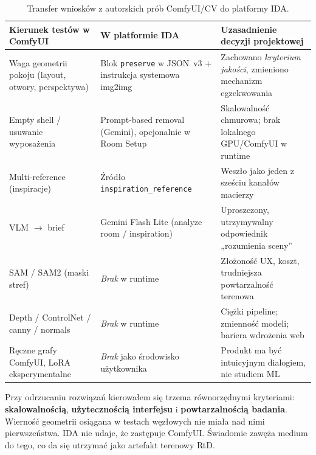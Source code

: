 \begin{table}[htbp]
  \centering
  \caption{Transfer wniosków z autorskich prób ComfyUI/CV do platformy IDA.}
  \label{tab:ch07:comfyui-transfer}
  \begin{tabular}{@{}>{\raggedright\arraybackslash}p{}>{\raggedright\arraybackslash}p{}>{\raggedright\arraybackslash}p{}@{}}
    \toprule
    Kierunek testów w ComfyUI & W platformie IDA & Uzasadnienie decyzji projektowej \\
    \midrule
    Waga geometrii pokoju (layout, otwory, perspektywa) &
    Blok \texttt{preserve} w JSON~v3 + instrukcja systemowa img2img &
    Zachowano \emph{kryterium jakości}, zmieniono mechanizm egzekwowania \\
    \addlinespace
    Empty shell / usuwanie wyposażenia &
    Prompt-based removal (Gemini), opcjonalnie w Room Setup &
    Skalowalność chmurowa; brak lokalnego GPU/ComfyUI w runtime \\
    \addlinespace
    Multi-reference (inspiracje) &
    Źródło \texttt{inspiration\_reference} &
    Weszło jako jeden z sześciu kanałów macierzy \\
    \addlinespace
    VLM $\rightarrow$ brief &
    Gemini Flash Lite (analyze room / inspiration) &
    Uproszczony, utrzymywalny odpowiednik „rozumienia sceny” \\
    \addlinespace
    SAM / SAM2 (maski stref) &
    \emph{Brak} w runtime &
    Złożoność UX, koszt, trudniejsza powtarzalność terenowa \\
    \addlinespace
    Depth / ControlNet / canny / normals &
    \emph{Brak} w runtime &
    Ciężki pipeline; zmienność modeli; bariera wdrożenia web \\
    \addlinespace
    Ręczne grafy ComfyUI, LoRA eksperymentalne &
    \emph{Brak} jako środowisko użytkownika &
    Produkt ma być intuicyjnym dialogiem, nie studiem ML \\
    \bottomrule
  \end{tabular}
\end{table}

Przy odrzucaniu rozwiązań kierowałem się trzema równorzędnymi kryteriami: \textbf{skalowalnością}, \textbf{użytecznością interfejsu} i \textbf{powtarzalnością badania}. Wierność geometrii osiągana w testach węzłowych nie miała nad nimi pierwszeństwa. IDA nie udaje, że zastępuje ComfyUI. Świadomie zawęża medium do tego, co da się utrzymać jako artefakt terenowy RtD.

